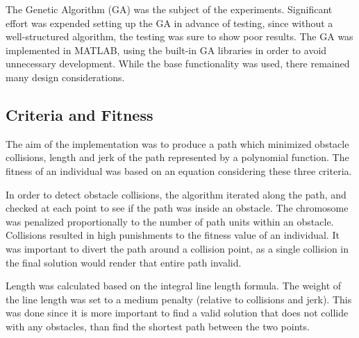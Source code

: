 %
The Genetic Algorithm (GA) was the subject of the experiments. Significant effort was expended setting up the GA in advance of testing, since without a well-structured algorithm, the testing was sure to show poor results. The GA was implemented in MATLAB, using the built-in GA libraries in order to avoid unnecessary development. While the base functionality was used, there remained many design considerations.

\subsection{Criteria and Fitness}
The aim of the implementation was to produce a path which minimized obstacle collisions, length and jerk of the path represented by a polynomial function. The fitness of an individual was based on an equation considering these three criteria.

In order to detect obstacle collisions, the algorithm iterated along the path, and checked at each point to see if the path was inside an obstacle. The chromosome was penalized proportionally to the number of path units within an obstacle. Collisions resulted in high punishments to the fitness value of an individual. It was important to divert the path around a collision point, as a single collision in the final solution would render that entire path invalid.

Length was calculated based on the integral line length formula. The weight of the line length was set to a medium penalty (relative to collisions and jerk). This was done since it is more important to find a valid solution that does not collide with any obstacles, than find the shortest path between the two points.

